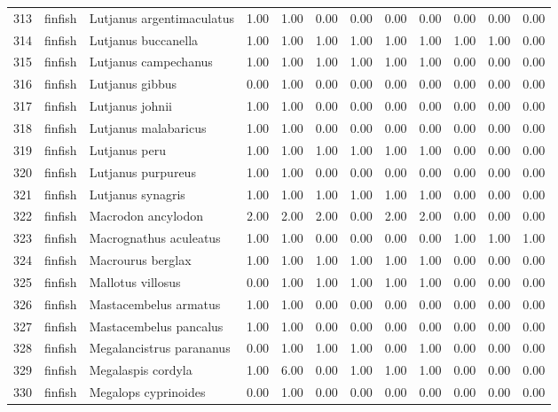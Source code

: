 \begin{table}[ht]
\begin{tabular}{rllrrrrrrrrr}
  313 & finfish & Lutjanus argentimaculatus & 1.00 & 1.00 & 0.00 & 0.00 & 0.00 & 0.00 & 0.00 & 0.00 & 0.00 \\ 
  314 & finfish & Lutjanus buccanella & 1.00 & 1.00 & 1.00 & 1.00 & 1.00 & 1.00 & 1.00 & 1.00 & 0.00 \\ 
  315 & finfish & Lutjanus campechanus & 1.00 & 1.00 & 1.00 & 1.00 & 1.00 & 1.00 & 0.00 & 0.00 & 0.00 \\ 
  316 & finfish & Lutjanus gibbus & 0.00 & 1.00 & 0.00 & 0.00 & 0.00 & 0.00 & 0.00 & 0.00 & 0.00 \\ 
  317 & finfish & Lutjanus johnii & 1.00 & 1.00 & 0.00 & 0.00 & 0.00 & 0.00 & 0.00 & 0.00 & 0.00 \\ 
  318 & finfish & Lutjanus malabaricus & 1.00 & 1.00 & 0.00 & 0.00 & 0.00 & 0.00 & 0.00 & 0.00 & 0.00 \\ 
  319 & finfish & Lutjanus peru & 1.00 & 1.00 & 1.00 & 1.00 & 1.00 & 1.00 & 0.00 & 0.00 & 0.00 \\ 
  320 & finfish & Lutjanus purpureus & 1.00 & 1.00 & 0.00 & 0.00 & 0.00 & 0.00 & 0.00 & 0.00 & 0.00 \\ 
  321 & finfish & Lutjanus synagris & 1.00 & 1.00 & 1.00 & 1.00 & 1.00 & 1.00 & 0.00 & 0.00 & 0.00 \\ 
  322 & finfish & Macrodon ancylodon & 2.00 & 2.00 & 2.00 & 0.00 & 2.00 & 2.00 & 0.00 & 0.00 & 0.00 \\ 
  323 & finfish & Macrognathus aculeatus & 1.00 & 1.00 & 0.00 & 0.00 & 0.00 & 0.00 & 1.00 & 1.00 & 1.00 \\ 
  324 & finfish & Macrourus berglax & 1.00 & 1.00 & 1.00 & 1.00 & 1.00 & 1.00 & 0.00 & 0.00 & 0.00 \\ 
  325 & finfish & Mallotus villosus & 0.00 & 1.00 & 1.00 & 1.00 & 1.00 & 1.00 & 0.00 & 0.00 & 0.00 \\ 
  326 & finfish & Mastacembelus armatus & 1.00 & 1.00 & 0.00 & 0.00 & 0.00 & 0.00 & 0.00 & 0.00 & 0.00 \\ 
  327 & finfish & Mastacembelus pancalus & 1.00 & 1.00 & 0.00 & 0.00 & 0.00 & 0.00 & 0.00 & 0.00 & 0.00 \\ 
  328 & finfish & Megalancistrus parananus & 0.00 & 1.00 & 1.00 & 1.00 & 0.00 & 1.00 & 0.00 & 0.00 & 0.00 \\ 
  329 & finfish & Megalaspis cordyla & 1.00 & 6.00 & 0.00 & 1.00 & 1.00 & 1.00 & 0.00 & 0.00 & 0.00 \\ 
  330 & finfish & Megalops cyprinoides & 0.00 & 1.00 & 0.00 & 0.00 & 0.00 & 0.00 & 0.00 & 0.00 & 0.00 \\ 

\end{tabular}
\end{table}
